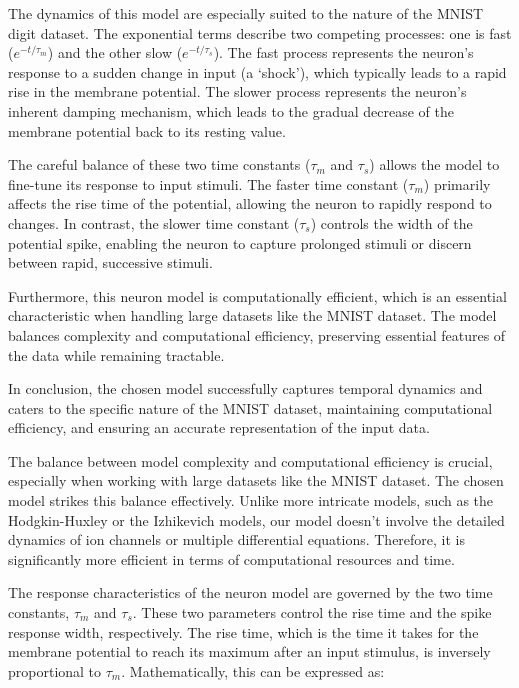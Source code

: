 The dynamics of this model are especially suited to the nature of the MNIST digit dataset. The exponential terms describe two competing processes: one is fast ($e^{-t/\tau_m}$) and the other slow ($e^{-t/\tau_s}$). The fast process represents the neuron's response to a sudden change in input (a `shock'), which typically leads to a rapid rise in the membrane potential. The slower process represents the neuron's inherent damping mechanism, which leads to the gradual decrease of the membrane potential back to its resting value. 

The careful balance of these two time constants ($\tau_m$ and $\tau_s$) allows the model to fine-tune its response to input stimuli. The faster time constant ($\tau_m$) primarily affects the rise time of the potential, allowing the neuron to rapidly respond to changes. In contrast, the slower time constant ($\tau_s$) controls the width of the potential spike, enabling the neuron to capture prolonged stimuli or discern between rapid, successive stimuli.

Furthermore, this neuron model is computationally efficient, which is an essential characteristic when handling large datasets like the MNIST dataset. The model balances complexity and computational efficiency, preserving essential features of the data while remaining tractable.

In conclusion, the chosen model successfully captures temporal dynamics and caters to the specific nature of the MNIST dataset, maintaining computational efficiency, and ensuring an accurate representation of the input data.


The balance between model complexity and computational efficiency is crucial, especially when working with large datasets like the MNIST dataset. The chosen model strikes this balance effectively. Unlike more intricate models, such as the Hodgkin-Huxley or the Izhikevich models, our model doesn't involve the detailed dynamics of ion channels or multiple differential equations. Therefore, it is significantly more efficient in terms of computational resources and time.

The response characteristics of the neuron model are governed by the two time constants, $\tau_m$ and $\tau_s$. These two parameters control the rise time and the spike response width, respectively. The rise time, which is the time it takes for the membrane potential to reach its maximum after an input stimulus, is inversely proportional to $\tau_m$. Mathematically, this can be expressed as:


